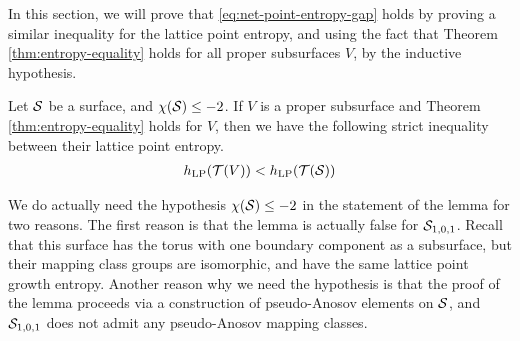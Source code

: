 In this section, we will prove that \eqref{eq:net-point-entropy-gap} holds by proving a similar inequality for the lattice point entropy, and using the fact that Theorem \ref{thm:entropy-equality} holds for all proper subsurfaces $V$, by the inductive hypothesis.

\begin{lemma}
  \label{lem:entropy-inequality}
  Let $\mathcal{S}$ be a surface, and $\chi(\mathcal{S}) \leq -2$. If $V$ is a proper subsurface and Theorem \ref{thm:entropy-equality} holds for $V$, then we have the following strict inequality between their lattice point entropy.
  \begin{align*}
    h_{\mathrm{LP}}(\mathcal{T}(V)) < h_{\mathrm{LP}}(\mathcal{T}(\mathcal{S}))
  \end{align*}
\end{lemma}

\begin{remark}
  We do actually need the hypothesis $\chi(\mathcal{S}) \leq -2$ in the statement of the lemma for two reasons.
  The first reason is that the lemma is actually false for $\mathcal{S}_{1,0,1}$.
  Recall that this surface has the torus with one boundary component as a subsurface, but their mapping class groups are isomorphic, and have the same lattice point growth entropy.
  Another reason why we need the hypothesis is that the proof of the lemma proceeds via a construction of pseudo-Anosov elements on $\mathcal{S}$, and $\mathcal{S}_{1,0,1}$ does not admit any pseudo-Anosov mapping classes.
\end{remark}

